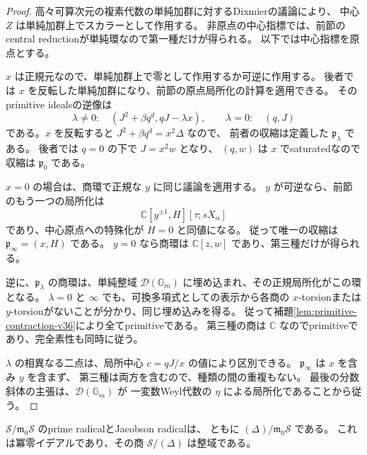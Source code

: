 \begin{proof}
高々可算次元の複素代数の単純加群に対するDixmierの議論により、
中心 $Z$ は単純加群上でスカラーとして作用する。
非原点の中心指標では、前節のcentral reductionが単純環なので第一種だけが得られる。
以下では中心指標を原点とする。

$x$ は正規元なので、単純加群上で零として作用するか可逆に作用する。
後者では $x$ を反転した単純加群になり、前節の原点局所化の計算を適用できる。
そのprimitive idealsの逆像は
\[
 \lambda\ne0:\quad(J^2+\beta q^d,qJ-\lambda x),
 \qquad \lambda=0:\quad(q,J)
\]
である。$x$ を反転すると $J^2+\beta q^d=x^2\Delta$ なので、
前者の収縮は定義した $\mathfrak p_\lambda$ である。
後者では $q=0$ の下で $J=x^2w$ となり、
$(q,w)$ は $x$ でsaturatedなので収縮は $\mathfrak p_0$ である。

$x=0$ の場合は、商環で正規な $y$ に同じ議論を適用する。
$y$ が可逆なら、前節のもう一つの局所化は
\[
 \mathbb C[y^{\pm1},H][\tau;sX_\alpha]
\]
であり、中心原点への特殊化が $H=0$ と同値になる。
従って唯一の収縮は $\mathfrak p_\infty=(x,H)$ である。
$y=0$ なら商環は $\mathbb C[z,w]$ であり、第三種だけが得られる。

逆に、$\mathfrak p_\lambda$ の商環は、単純整域
$\mathcal D(\mathbb G_m)$ に埋め込まれ、その正規局所化がこの環となる。
$\lambda=0$ と $\infty$ でも、可換多項式としての表示から各商の
$x$-torsionまたは $y$-torsionがないことが分かり、同じ埋め込みを得る。
従って補題\ref{lem:primitive-contraction-v36}により全てprimitiveである。
第三種の商は $\mathbb C$ なのでprimitiveであり、完全素性も同時に従う。

$\lambda$ の相異なる二点は、局所中心 $c=qJ/x$ の値により区別できる。
$\mathfrak p_\infty$ は $x$ を含み $y$ を含まず、
第三種は両方を含むので、種類の間の重複もない。
最後の分数斜体の主張は、$\mathcal D(\mathbb G_m)$ が
一変数Weyl代数の $\eta$ による局所化であることから従う。
\end{proof}

\begin{corollary}[原点fiberの根基]
\label{cor:origin-radical-v36}
$\mathcal S/\mathfrak m_0\mathcal S$ のprime radicalとJacobson radicalは、
ともに $(\Delta)/\mathfrak m_0\mathcal S$ である。
これは冪零イデアルであり、その商 $\mathcal S/(\Delta)$ は整域である。
\end{corollary}

